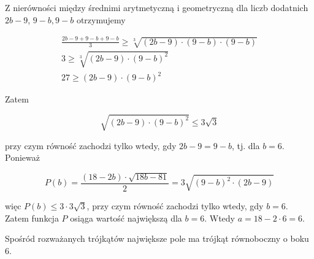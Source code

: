 \documentclass[10pt]{article}
\begin{document}
Z nierówności między średnimi arytmetyczną i geometryczną dla liczb dodatnich $2 b-9$, $9-b, 9-b$ otrzymujemy

$$
\begin{gathered}
\frac{2 b-9+9-b+9-b}{3} \geq \sqrt[3]{(2 b-9) \cdot(9-b) \cdot(9-b)} \\
3 \geq \sqrt[3]{(2 b-9) \cdot(9-b)^{2}} \\
27 \geq(2 b-9) \cdot(9-b)^{2}
\end{gathered}
$$

Zatem

$$
\sqrt{(2 b-9) \cdot(9-b)^{2}} \leq 3 \sqrt{3}
$$

przy czym równość zachodzi tylko wtedy, gdy $2 b-9=9-b$, tj. dla $b=6$. Ponieważ

$$
P(b)=\frac{(18-2 b) \cdot \sqrt{18 b-81}}{2}=3 \sqrt{(9-b)^{2} \cdot(2 b-9)}
$$

więc $P(b) \leq 3 \cdot 3 \sqrt{3}$, przy czym równość zachodzi tylko wtedy, gdy $b=6$.\\
Zatem funkcja $P$ osiąga wartość największą dla $b=6$. Wtedy $a=18-2 \cdot 6=6$.

Spośród rozważanych trójkątów największe pole ma trójkąt równoboczny o boku 6.
\end{document}
